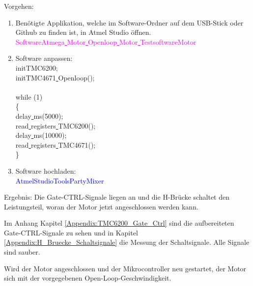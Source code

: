 Vorgehen:
\begin{enumerate}
\item Benötigte Applikation, welche im Software-Ordner auf dem USB-Stick oder Github \cite{aebi_projekt-6softwareatmega_2020} zu finden ist, in Atmel Studio öffnen.\\
\textcolor{magenta}{Software\textrightarrow Atmega\underline{ }Motor\underline{ }Openloop\underline{ }Motor\underline{ }Testsoftware\textrightarrow Motor}\\


\item Software anpassen:\\
\textcolor{OliveGreen}{
	initTMC6200;\\
	initTMC4671\underline{ }Openloop();\\
\\
    while (1) \\
    \{\\
		\underline{ }delay\underline{ }ms(5000);\\
		read\underline{ }registers\underline{ }TMC6200();\\
		\underline{ }delay\underline{ }ms(10000);\\
		read\underline{ }registers\underline{ }TMC4671();\\
    \}
}\newline
\item Software hochladen:\\
\textcolor{blue}{AtmelStudio\textrightarrow Tools\textrightarrow PartyMixer}\\
\end{enumerate}

Ergebnis: Die Gate-CTRL-Signale liegen an und die H-Brücke schaltet den Leistungsteil, woran der Motor jetzt angeschlossen werden kann.

Im Anhang Kapitel \ref{Appendix:TMC6200_Gate_Ctrl} sind die aufbereiteten Gate-CTRL-Signale zu sehen und in Kapitel \ref{Appendix:H_Bruecke_Schaltsignale} die Messung der Schaltsignale. Alle Signale sind sauber.

Wird der Motor angeschlossen und der Mikrocontroller neu gestartet, der Motor sich mit der vorgegebenen Open-Loop-Geschwindigkeit.